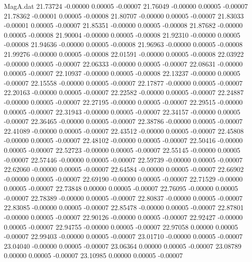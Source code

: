 \begin{filecontents}{MagA.dat}
  21.73724   -0.00000    0.00005   -0.00007
  21.76049   -0.00000    0.00005   -0.00007
  21.78362   -0.00001    0.00005   -0.00008
  21.80707   -0.00000    0.00005   -0.00007
  21.83033   -0.00001    0.00005   -0.00007
  21.85351   -0.00000    0.00005   -0.00008
  21.87682   -0.00000    0.00005   -0.00008
  21.90004   -0.00000    0.00005   -0.00008
  21.92310   -0.00000    0.00005   -0.00008
  21.94636   -0.00000    0.00005   -0.00008
  21.96963   -0.00000    0.00005   -0.00008
  21.99276   -0.00000    0.00005   -0.00008
  22.01591   -0.00000    0.00005   -0.00008
  22.03922   -0.00000    0.00005   -0.00007
  22.06333   -0.00000    0.00005   -0.00007
  22.08631   -0.00000    0.00005   -0.00007
  22.10937   -0.00000    0.00005   -0.00008
  22.13237   -0.00000    0.00005   -0.00007
  22.15558   -0.00000    0.00005   -0.00007
  22.17877   -0.00000    0.00005   -0.00007
  22.20163   -0.00000    0.00005   -0.00007
  22.22582   -0.00000    0.00005   -0.00007
  22.24887   -0.00000    0.00005   -0.00007
  22.27195   -0.00000    0.00005   -0.00007
  22.29515   -0.00000    0.00005   -0.00007
  22.31943   -0.00000    0.00005   -0.00007
  22.34157   -0.00000    0.00005   -0.00007
  22.36465   -0.00000    0.00005   -0.00007
  22.38786   -0.00000    0.00005   -0.00007
  22.41089   -0.00000    0.00005   -0.00007
  22.43512   -0.00000    0.00005   -0.00007
  22.45808   -0.00000    0.00005   -0.00007
  22.48102   -0.00000    0.00005   -0.00007
  22.50416   -0.00000    0.00005   -0.00007
  22.52723   -0.00000    0.00005   -0.00007
  22.55145   -0.00000    0.00005   -0.00007
  22.57446   -0.00000    0.00005   -0.00007
  22.59739   -0.00000    0.00005   -0.00007
  22.62060   -0.00000    0.00005   -0.00007
  22.64584   -0.00000    0.00005   -0.00007
  22.66902   -0.00000    0.00005   -0.00007
  22.69190   -0.00000    0.00005   -0.00007
  22.71529   -0.00000    0.00005   -0.00007
  22.73848    0.00000    0.00005   -0.00007
  22.76095   -0.00000    0.00005   -0.00007
  22.78389   -0.00000    0.00005   -0.00007
  22.80837   -0.00000    0.00005   -0.00007
  22.83085   -0.00000    0.00005   -0.00007
  22.85478   -0.00000    0.00005   -0.00007
  22.87801   -0.00000    0.00005   -0.00007
  22.90126   -0.00000    0.00005   -0.00007
  22.92427   -0.00000    0.00005   -0.00007
  22.94755   -0.00000    0.00005   -0.00007
  22.97058    0.00000    0.00005   -0.00007
  22.99403   -0.00000    0.00005   -0.00007
  23.01710   -0.00000    0.00005   -0.00007
  23.04040   -0.00000    0.00005   -0.00007
  23.06364    0.00000    0.00005   -0.00007
  23.08789    0.00000    0.00005   -0.00007
  23.10985    0.00000    0.00005   -0.00007

\end{filecontents}
